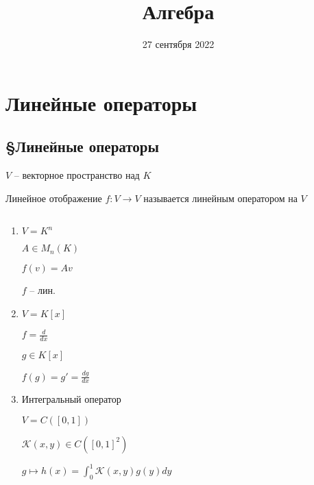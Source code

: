 


    \title{Алгебра}
    \date{27 сентября 2022}
    \maketitle

    \pagebreak

    \section*{Линейные операторы}
    \subsection*{\S Линейные операторы}

    \begin{definition}
        $V$ -- векторное пространство над $K$
        \par Линейное отображение $f : V \rightarrow V$ называется линейным оператором на $V$
    \end{definition}

    \begin{illustration}
        $ $
        \begin{enumerate}
            \item $V = K^n$
                \par $A \in M_n(K)$
                \par $f(v) = Av$
                \par $f$ -- лин.
            \item $V = K[x]$
                \par $f = \frac{d}{dx}$
                \par $g \in K[x]$
                \par $f(g) = g' = \frac{dg}{dx}$
            \item Интегральный оператор
                \par $V = C([0, 1])$
                \par $\mathcal{K}(x, y) \in C([0, 1]^2)$
                \par $g \mapsto h(x) = \int_0^1 \mathcal{K}(x, y)g(y)dy$
        \end{enumerate}
    \end{illustration}

    $ $

